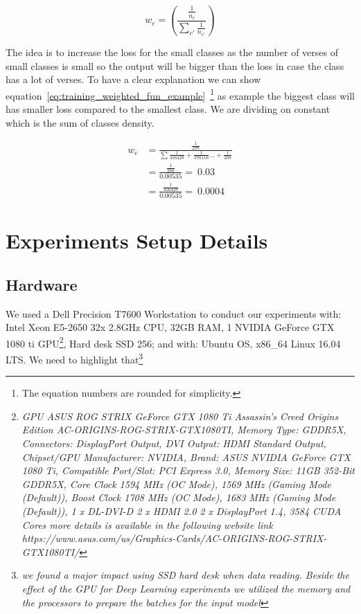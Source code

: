 \begin{equation}\label{eq:training_weighted_fun}
  w_c = \left(\frac{\frac{1}{n_c}}{\sum_{c'} \frac{1}{n_{c'}}} \right)
\end{equation}

The idea is to increase the loss for the small classes as the number of verses of small classes is small so the output will be bigger than the loss in case the class has a lot of verses. To have a clear explanation we can show equation~\ref{eq:training_weighted_fun_example}~\footnote{The equation numbers are rounded for simplicity.} as example the biggest class will has smaller loss compared to the smallest class. We are dividing on constant which is the sum of classes density. 

\begin{subequations}
\begin{align}
  w_c &=  \frac{\frac{1}{288}}{\sum\frac{1}{416428}+\frac{1}{370116}\dots+\frac{1}{288}}\\
      &= \frac{\frac{1}{288}}{0.00535} = ~0.03 \\
        &= \frac{\frac{1}{416428}}{0.00535} = ~0.0004
\end{align}\label{eq:training_weighted_fun_example}
\end{subequations}
\newpage
\section{Experiments Setup Details}

\subsection{Hardware}

We used a Dell Precision T7600 Workstation to conduct our experiments with: Intel Xeon E5-2650 32x 2.8GHz CPU, 32GB RAM, 1 NVIDIA GeForce GTX 1080 ti GPU\footnote{\textit{GPU ASUS ROG STRIX GeForce GTX 1080 Ti Assassin's Creed Origins Edition AC-ORIGINS-ROG-STRIX-GTX1080TI, Memory Type: GDDR5X, Connectors: DisplayPort Output, DVI Output: HDMI Standard Output, Chipset/GPU Manufacturer: NVIDIA, Brand: ASUS NVIDIA GeForce GTX 1080 Ti, Compatible Port/Slot: PCI Express 3.0, Memory Size: 11GB 352-Bit GDDR5X, Core Clock 1594 MHz (OC Mode), 1569 MHz (Gaming Mode (Default)), Boost Clock 1708 MHz (OC Mode), 1683 MHz (Gaming Mode (Default)), 1 x DL-DVI-D 2 x HDMI 2.0 2 x DisplayPort 1.4, 3584 CUDA Cores more details is available in the following website link https://www.asus.com/us/Graphics-Cards/AC-ORIGINS-ROG-STRIX-GTX1080TI/} }, Hard desk SSD 256; and with: Ubuntu OS, x86\_64 Linux 16.04 LTS. We need to highlight that\footnote{\textit{we found a major impact using SSD hard desk when data reading. Beside the effect of the GPU for Deep Learning experiments we utilized the memory and the processors to prepare the batches for the input model}}


